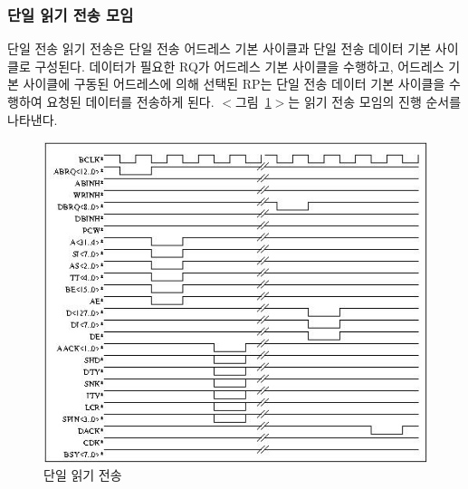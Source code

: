 \subsubsection{단일 읽기 전송 모임}
단일 전송 읽기 전송은 단일 전송 어드레스 기본 사이클과 단일 전송 데이터 기본 사이클로 구성된다.
데이터가 필요한 RQ가 어드레스 기본 사이클을 수행하고, 어드레스 기본 사이클에 구동된 어드레스에 의해
선택된 RP는 단일 전송 데이터 기본 사이클을 수행하여 요청된 데이터를 전송하게 된다.
$<$그림~\ref{figure:single-read}$>$는 읽기 전송 모임의 진행 순서를 나타낸다.
%
\begin{figure}[hp]
   \centerline{\includegraphics{ch3/FIG/single-read.jpg}}
   \caption{단일 읽기 전송}\label{figure:single-read}
\end{figure}
%

